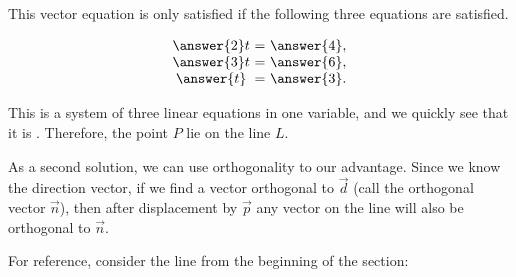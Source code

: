 \documentclass{ximera}
\begin{document}
\begin{example}
  This vector equation is only satisfied if the following three equations are satisfied.

  \begin{equation*}
    \begin{array}{c@{~}c@{~}l}
      \answer{2}t &=& \answer{4}, \\
      \answer{3}t &=& \answer{6}, \\
      \answer{t} &=& \answer{3}.
    \end{array}
  \end{equation*}

  This is a system of three linear equations in one variable, and we
  quickly see that it is . Therefore, the point $P$ 
  lie on the line $L$.


  As a second solution, we can use orthogonality to our advantage. Since we know the direction vector, if we find a vector orthogonal to $\vec{d}$ (call the orthogonal vector $\vec{n}$), then after displacement by $\vec{p}$ any vector on the line will also be orthogonal to $\vec{n}$.

  For reference, consider the line from the beginning of the section:

  \begin{center}
    \end{center}


\end{example}
\end{document}
